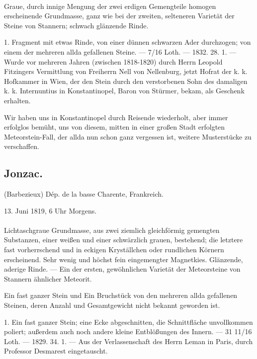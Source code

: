 \documentclass[a4paper, 11pt, oneside, polutonikogreek, german]{article}
\begin{document}
\paragraph{}
Graue, durch innige Mengung der zwei erdigen Gemengteile homogen erscheinende Grundmasse, ganz wie bei der zweiten, selteneren Varietät der Steine von Stannern; schwach glänzende Rinde.

1. Fragment mit etwas Rinde, von einer dünnen schwarzen Ader durchzogen; von einem der mehreren allda gefallenen Steine. — 7/16 Loth. — 1832. 28. 1. — Wurde vor mehreren Jahren (zwischen 1818-1820) durch Herrn Leopold Fitzingers Vermittlung von Freiherrn Nell von Nellenburg, jetzt Hofrat der k. k. Hofkammer in Wien, der den Stein durch den verstorbenen Sohn des damaligen k. k. Internuntius in Konstantinopel, Baron von Stürmer, bekam, als Geschenk erhalten.

Wir haben uns in Konstantinopel durch Reisende wiederholt, aber immer erfolglos bemüht, uns von diesem, mitten in einer großen Stadt erfolgten Meteorstein-Fall, der allda nun schon ganz vergessen ist, weitere Musterstücke zu verschaffen.
\subsection{Jonzac.}
\begin{center}
\small
(Barbezieux) Dép. de la basse Charente, Frankreich.

13. Juni 1819, 6 Uhr Morgens.
\end{center}
\paragraph{}
Lichtaschgraue Grundmasse, aus zwei ziemlich gleichförmig gemengten Substanzen, einer weißen und einer schwärzlich grauen, bestehend; die letztere fast vorherrschend und in eckigen Kryställchen oder rundlichen Körnern erscheinend. Sehr wenig und höchst fein eingemengter Magnetkies. Glänzende, aderige Rinde. — Ein der ersten, gewöhnlichen Varietät der Meteorsteine von Stannern ähnlicher Meteorit.

Ein fast ganzer Stein und Ein Bruchstück von den mehreren allda gefallenen Steinen, deren Anzahl und Gesamtgewicht nicht bekannt geworden ist.

1. Ein fast ganzer Stein; eine Ecke abgeschnitten, die Schnittfläche unvollkommen poliert; außerdem auch noch andere kleine Entblößungen des Innern. — 31 11/16 Loth. — 1829. 34. 1. — Aus der Verlassenschaft des Herrn Leman in Paris, durch Professor Desmarest eingetauscht.
\end{document}
